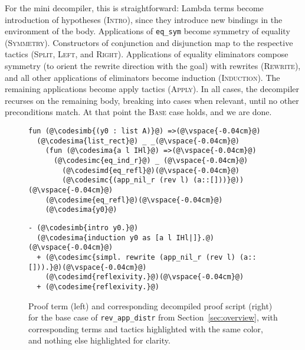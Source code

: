 For the mini decompiler, this is straightforward: Lambda terms become introduction of hypotheses (\textsc{Intro}), since they introduce new bindings
in the environment of the body. Applications of \lstinline{eq_sym} become symmetry of equality (\textsc{Symmetry}).
Constructors of conjunction and disjunction map to the respective tactics (\textsc{Split}, \textsc{Left}, and \textsc{Right}).
Applications of equality eliminators compose symmetry (to orient the rewrite direction with the goal) with rewrites (\textsc{Rewrite}),
and all other applications of eliminators become induction (\textsc{Induction}).
The remaining applications become apply tactics (\textsc{Apply}).
In all cases, the decompiler recurses on the remaining body, breaking into cases when relevant, until no other preconditions match.
At that point the \textsc{Base} case holds, and we are done.

\begin{figure}
\begin{minipage}{0.44\textwidth}
\begin{lstlisting}
fun (@\codesimb{(y0 : list A)}@) =>(@\vspace{-0.04cm}@)
  (@\codesima{list_rect}@) _ _(@\vspace{-0.04cm}@)
    (fun (@\codesima{a l IHl}@) =>(@\vspace{-0.04cm}@)
      (@\codesimc{eq_ind_r}@) _ (@\vspace{-0.04cm}@)
        (@\codesimd{eq_refl}@)(@\vspace{-0.04cm}@)
        (@\codesimc{(app_nil_r (rev l) (a::[]))}@))(@\vspace{-0.04cm}@)
    (@\codesime{eq_refl}@)(@\vspace{-0.04cm}@)
    (@\codesima{y0}@)
\end{lstlisting}
\end{minipage}
\hfill
\begin{minipage}{0.54\textwidth}
\begin{lstlisting}
- (@\codesimb{intro y0.}@)
  (@\codesima{induction y0 as [a l IHl|]}.@)(@\vspace{-0.04cm}@)
  + (@\codesimc{simpl. rewrite (app_nil_r (rev l) (a::[])).}@)(@\vspace{-0.04cm}@)
    (@\codesimd{reflexivity.}@)(@\vspace{-0.04cm}@)
  + (@\codesime{reflexivity.}@)
\end{lstlisting}
\end{minipage}
\vspace{-0.3cm}
\caption{Proof term (left) and corresponding decompiled proof script (right) for the base case of 
\lstinline{rev_app_distr} from Section~\ref{sec:overview}, with corresponding terms and tactics 
highlighted with the same color, and nothing else highlighted for clarity.}
\label{fig:rainbow}
\end{figure}

